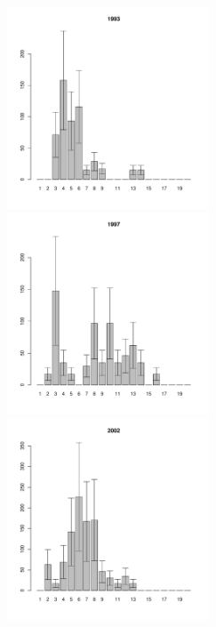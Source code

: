 \begin{figure}[h]
\begin{multicols}{3}
\hfill
\includegraphics[width=60mm]{../White_Sea/Luvenga_II_razrez/high_beatch_1993_.pdf}
\hfill
\includegraphics[width=60mm]{../White_Sea/Luvenga_II_razrez/high_beatch_1997_.pdf}
\hfill
\includegraphics[width=60mm]{../White_Sea/Luvenga_II_razrez/high_beatch_2002_.pdf}
\end{multicols}



\end{figure}
